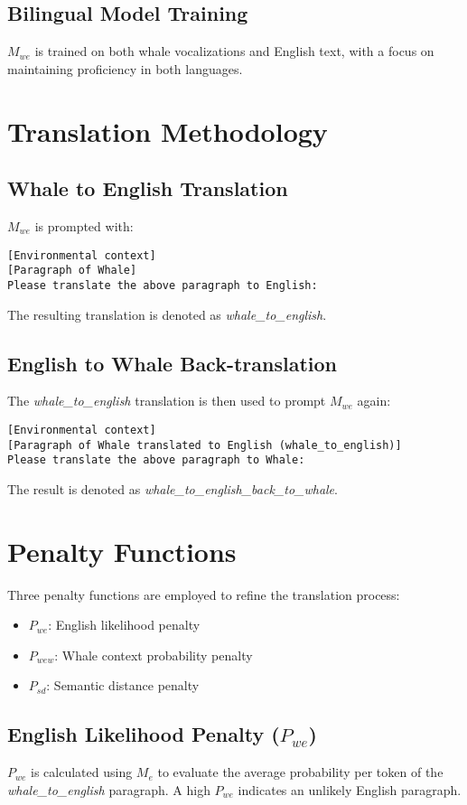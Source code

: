 \documentclass{article}
\begin{document}
\subsection{Bilingual Model Training}
$M_{we}$ is trained on both whale vocalizations and English text, with a focus on maintaining proficiency in both languages.

\section{Translation Methodology}
\subsection{Whale to English Translation}
$M_{we}$ is prompted with:
\begin{verbatim}
[Environmental context]
[Paragraph of Whale]
Please translate the above paragraph to English:
\end{verbatim}

The resulting translation is denoted as \textit{whale\_to\_english}.

\subsection{English to Whale Back-translation}
The \textit{whale\_to\_english} translation is then used to prompt $M_{we}$ again:
\begin{verbatim}
[Environmental context]
[Paragraph of Whale translated to English (whale_to_english)]
Please translate the above paragraph to Whale:
\end{verbatim}

The result is denoted as \textit{whale\_to\_english\_back\_to\_whale}.

\section{Penalty Functions}
Three penalty functions are employed to refine the translation process:

\begin{itemize}
    \item $P_{we}$: English likelihood penalty
    \item $P_{wew}$: Whale context probability penalty
    \item $P_{sd}$: Semantic distance penalty
\end{itemize}

\subsection{English Likelihood Penalty ($P_{we}$)}
$P_{we}$ is calculated using $M_e$ to evaluate the average probability per token of the \textit{whale\_to\_english} paragraph. A high $P_{we}$ indicates an unlikely English paragraph.
\end{document}
